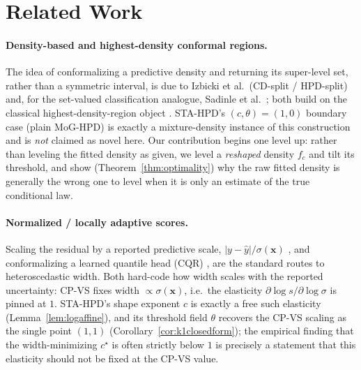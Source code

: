 \documentclass[10pt,twocolumn,a4paper]{article}
\begin{document}
\section{Related Work}
\label{sec:related}

\paragraph{Density-based and highest-density conformal regions.} The idea of conformalizing a
predictive density and returning its super-level set, rather than a symmetric interval, is due to
Izbicki et al.\ (CD-split / HPD-split) \cite{izbicki2020cd} and, for the set-valued classification
analogue, Sadinle et al.\ \cite{sadinle2019least}; both build on the classical highest-density-region
object \cite{boxtiao1973bayesian,hyndman1996computing}. STA-HPD's $(c,\theta)=(1,0)$ boundary case
(plain MoG-HPD) is exactly a mixture-density instance of this construction and is \emph{not} claimed
as novel here. Our contribution begins one level up: rather than leveling the fitted density as
given, we level a \emph{reshaped} density $f_c$ and tilt its threshold, and show (Theorem~\ref{thm:optimality})
why the raw fitted density is generally the wrong one to level when it is only an estimate of the
true conditional law.

\paragraph{Normalized / locally adaptive scores.} Scaling the residual by a reported predictive
scale, $|y-\hat y|/\sigma(\bm x)$ \cite{lei2018distribution,papadopoulos2011regression}, and
conformalizing a learned quantile head (CQR) \cite{romano2019conformalized}, are the standard routes
to heteroscedastic width. Both hard-code how width scales with the reported uncertainty: CP-VS fixes
width $\propto\sigma(\bm x)$, i.e.\ the elasticity $\partial\log s/\partial\log\sigma$ is pinned at
$1$. STA-HPD's shape exponent $c$ is exactly a free such elasticity (Lemma~\ref{lem:logaffine}),
and its threshold field $\theta$ recovers the CP-VS scaling as the single point $(1,1)$
(Corollary~\ref{cor:k1closedform}); the empirical finding that the width-minimizing $c^\star$ is
often strictly below $1$ is precisely a statement that this elasticity should not be fixed at the
CP-VS value.
\end{document}
